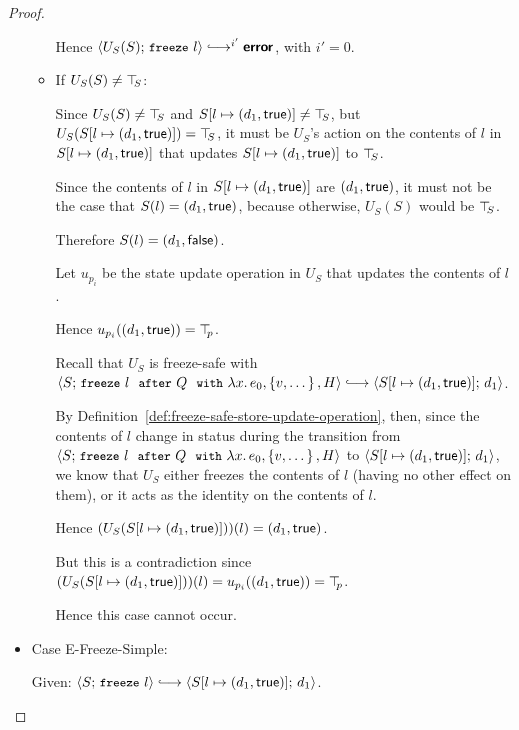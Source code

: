 \begin{proof}
\begin{itemize}
\begin{itemize}
      Hence $\config{U_S(S)}{\freeze{l}}
      \parstepsto^{i'} \error$, with $i' = 0$.

    \item If $U_S(S) \neq \top\hspace{-0.85mm}_{S}$:

      Since $U_S(S) \neq \top\hspace{-0.85mm}_{S}$ and $S[l \mapsto (d_1, \textsf{true})]
      \neq \top\hspace{-0.85mm}_{S}$, but $U_S(S[l \mapsto (d_1, \textsf{true})]) = \top\hspace{-0.85mm}_{S}$,
      it must be $U_S$'s action on the contents of $l$ in
      $S[l \mapsto (d_1, \textsf{true})]$ that updates
      $S[l \mapsto (d_1, \textsf{true})]$ to $\top\hspace{-0.85mm}_{S}$.

      Since the contents of $l$ in $S[l \mapsto (d_1, \textsf{true})]$ are
      $(d_1, \textsf{true})$, it must not be the case that $S(l) =
      (d_1, \textsf{true})$, because otherwise, $U_S(S)$ would be
      $\top\hspace{-0.85mm}_{S}$.

      Therefore $S(l) = (d_1, \textsf{false})$.

      Let $u_{p_i}$ be the state update operation in $U_S$ that
      updates the contents of $l$.

      Hence $u_{p_i}((d_1, \textsf{true})) = \top\hspace{-0.85mm}_{p}$.

      Recall that $U_S$ is freeze-safe with
      $\config{S}{\freezeafterfull{l}{Q}{\lam{x}{e_0}}{\setof{v,
            \dots}}{H}} \parstepsto
      \config{\extS{S}{l}{d_1}{\frozentrue}}{d_1}$.

      By Definition~\ref{def:freeze-safe-store-update-operation},
      then, since the contents of $l$ change in status during the
      transition from
      $\langle S;\, \mbox{\small{\texttt{freeze}}}~l~~{\mbox{\small{\texttt{after}}}}~Q~~{\mbox{\small{\texttt{with}}}}~\lambda x.\,e_0, \left\{v,
            \dots\right\}, H \rangle$ to
      $\langle S[l \mapsto (d_1, \textsf{true})];\, d_1 \rangle$, we know that
      $U_S$ either freezes the contents of $l$ (having no other effect
      on them), or it acts as the identity on the contents of $l$.

      Hence $(U_S(S[l \mapsto (d_1, \textsf{true})]))(l) =
      (d_1, \textsf{true})$.

      But this is a contradiction since
      $(U_S(S[l \mapsto (d_1, \textsf{true})]))(l) =
      u_{p_i}((d_1, \textsf{true})) = \top\hspace{-0.85mm}_{p}$.

      Hence this case cannot occur.
    \end{itemize}


  \item Case {\sc E-Freeze-Simple}:

    Given: $\config{S}{\freeze{l}} \parstepsto
    \config{\extS{S}{l}{d_1}{\frozentrue}}{d_1}$.


\end{itemize}
\end{proof}
